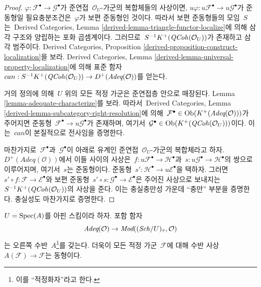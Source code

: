 \begin{proof}
$\varphi : \mathcal{F}^\bullet \to \mathcal{G}^\bullet$가 준연접\ 
$\mathcal{O}_U$-가군의 복합체들의 사상이면,
$u\varphi : u\mathcal{F}^\bullet \to
u\mathcal{G}^\bullet$가
준동형일 필요충분조건은\  $\varphi$가 보편 준동형인 것이다.
따라서 보편 준동형들의 모임\  $S$는\  Derived Categories, Lemma
\ref{derived-lemma-triangle-functor-localize}에 의해 삼각 구조와
양립하는 포화 곱셈계이다. 그러므로\ 
$S^{-1}K^+(\mathit{QCoh}(\mathcal{O}_U))$가 존재하고 삼각 범주이다.
Derived Categories, Proposition
\ref{derived-proposition-construct-localization}을 보라. Derived
Categories, Lemma \ref{derived-lemma-universal-property-localization}에
의해 표준 함자\ 
$can : S^{-1}K^+(\mathit{QCoh}(\mathcal{O}_U)) \to
D^{+}(\textit{Adeq}(\mathcal{O}))$를 얻는다.

\medskip\noindent
거의 정의에 의해\  $U$ 위의 모든 적정 가군은 준연접층 안으로
매장된다. Lemma \ref{lemma-adequate-characterize}를 보라. 따라서\ 
Derived Categories, Lemma
\ref{derived-lemma-subcategory-right-resolution}에 의해\ 
$\mathcal{F}^\bullet \in \mathop{\mathrm{Ob}}\nolimits(K^+(\textit{Adeq}(\mathcal{O})))$가
주어지면 준동형\  $\mathcal{F}^\bullet \to u\mathcal{G}^\bullet$가
존재하며, 여기서\ 
$\mathcal{G}^\bullet \in \mathop{\mathrm{Ob}}\nolimits(K^+(\mathit{QCoh}(\mathcal{O}_U)))$이다.
이는\  $can$이 본질적으로 전사임을 증명한다.

\medskip\noindent
마찬가지로\  $\mathcal{F}^\bullet$과\  $\mathcal{G}^\bullet$이 아래로
유계인 준연접\  $\mathcal{O}_U$-가군의 복합체라고 하자.
$D^+(\textit{Adeq}(\mathcal{O}))$에서 이들 사이의 사상은\ 
$f : u\mathcal{F}^\bullet \to \mathcal{H}^\bullet$과\ 
$s : u\mathcal{G}^\bullet \to \mathcal{H}^\bullet$의 쌍으로
이루어지며, 여기서\  $s$는 준동형이다. 준동형\ 
$s' : \mathcal{H}^\bullet \to u\mathcal{E}^\bullet$을 택하자.
그러면\  $s' \circ f : \mathcal{F} \to \mathcal{E}^\bullet$와 보편
준동형\  $s' \circ s : \mathcal{G}^\bullet \to \mathcal{E}^\bullet$은
주어진 사상으로 보내지는\ 
$S^{-1}K^{+}(\mathit{QCoh}(\mathcal{O}_U))$의 사상을 준다. 이는 충실충만성
가운데 ``충만'' 부분을 증명한다. 충실성도 마찬가지로 증명한다.
\end{proof}

\begin{lemma}
\label{lemma-right-adjoint-adequate}
$U = \mathop{\mathrm{Spec}}(A)$를 아핀 스킴이라 하자. 포함 함자
$$
\textit{Adeq}(\mathcal{O}) \to
\textit{Mod}((\mathit{Sch}/U)_\tau, \mathcal{O})
$$
는 오른쪽 수반\  $A$\footnote{이를 ``적정화자''라고 한다.}를 갖는다.
더욱이 모든 적정 가군\  $\mathcal{F}$에 대해 수반 사상\ 
$A(\mathcal{F}) \to \mathcal{F}$는 동형이다.
\end{lemma}

